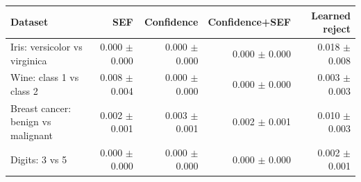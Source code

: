 \begin{tabular}{lrrrr}
\toprule
Dataset & SEF & Confidence & Confidence+SEF & Learned reject \\
\midrule
Iris: versicolor vs virginica & 0.000 $\pm$ 0.000 & 0.000 $\pm$ 0.000 & 0.000 $\pm$ 0.000 & 0.018 $\pm$ 0.008 \\
Wine: class 1 vs class 2 & 0.008 $\pm$ 0.004 & 0.000 $\pm$ 0.000 & 0.000 $\pm$ 0.000 & 0.003 $\pm$ 0.003 \\
Breast cancer: benign vs malignant & 0.002 $\pm$ 0.001 & 0.003 $\pm$ 0.001 & 0.002 $\pm$ 0.001 & 0.010 $\pm$ 0.003 \\
Digits: 3 vs 5 & 0.000 $\pm$ 0.000 & 0.000 $\pm$ 0.000 & 0.000 $\pm$ 0.000 & 0.002 $\pm$ 0.001 \\
\bottomrule
\end{tabular}
